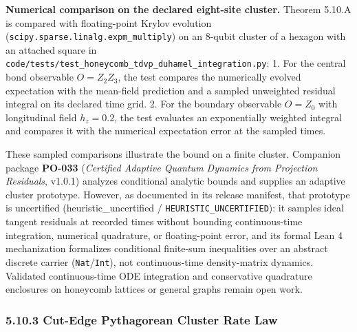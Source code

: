\documentclass[
  11pt,
]{article}
\begin{document}
\textbf{Numerical comparison on the declared eight-site cluster.}
Theorem 5.10.A is compared with floating-point Krylov evolution (\texttt{scipy.sparse.linalg.expm\_multiply}) on an 8-qubit cluster of a hexagon with an attached square in \texttt{code/tests/test\_honeycomb\_tdvp\_duhamel\_integration.py}:
1. For the central bond observable \(O=Z_2Z_3\), the test compares the
numerically evolved expectation with the mean-field prediction and a
sampled unweighted residual integral on its declared time grid.
2. For the boundary observable \(O=Z_0\) with longitudinal field \(h_z=0.2\),
the test evaluates an exponentially weighted integral and compares it with
the numerical expectation error at the sampled times.

These sampled comparisons illustrate the bound on a finite cluster. Companion package \textbf{PO-033} (\emph{Certified Adaptive Quantum Dynamics from Projection Residuals}, v1.0.1) analyzes conditional analytic bounds and supplies an adaptive cluster prototype. However, as documented in its release manifest, that prototype is uncertified (heuristic\_uncertified / \texttt{HEURISTIC\_UNCERTIFIED}): it samples ideal tangent residuals at recorded times without bounding continuous-time integration, numerical quadrature, or floating-point error, and its formal Lean 4 mechanization formalizes conditional finite-sum inequalities over an abstract discrete carrier (\texttt{Nat}/\texttt{Int}), not continuous-time density-matrix dynamics. Validated continuous-time ODE integration and conservative quadrature enclosures on honeycomb lattices or general graphs remain open work.

\subsubsection{5.10.3 Cut-Edge Pythagorean Cluster Rate Law}\label{cut-edge-pythagorean-cluster-rate-law}
\end{document}

